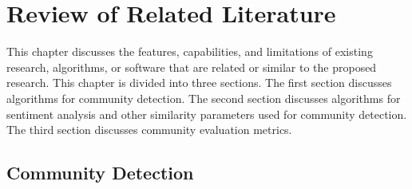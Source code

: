 %
%
%                 

\chapter{Review of Related Literature}
\label{sec:relatedlit}

This chapter discusses the features, capabilities, and limitations of existing research, algorithms, or software that are related or similar to the proposed research. This chapter is divided into three sections. The first section discusses algorithms for community detection. The second section discusses algorithms for sentiment analysis and other similarity parameters used for community detection. The third section discusses community evaluation metrics.

\begin{comment}
%
%
Guide on Writing your RRL chapter

1. Identify the keywords with respect to your research
One keyword = One document section
Examples: 2.1 Story Generation Systems
2.2 Knowledge Representation

2.  Find references using these keywords

3.  For each of the references that you find,
Check: Is it relevant to your research?
Use their references to find more relevant works.

4. Identify a set of criteria for comparison.
It will serve as a guide to help you focus on what to look for

5. Write a summary focusing on -
What: A short description of the work
How: A summary of the approach it utilized
Findings: If applicable, provide the results
Why: Relevance to your work

6. At the end of each section,  show a Table of Comparison of the related works 
and your proposed project/system

\end{comment}

\section{Community Detection}

